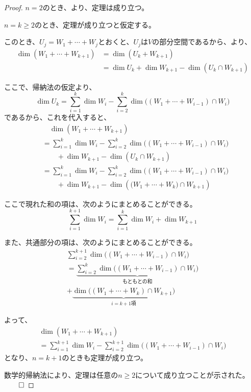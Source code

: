 \documentclass[../../../topic_linear-algebra]{subfiles}
\begin{document}
\begin{proof}
  $n = 2$のとき、より、定理は成り立つ。
  
  \br
  
  $n = k \geq 2$のとき、定理が成り立つと仮定する。

  このとき、$U_j = W_1 + \cdots + W_j$とおくと、$U_j$は$V$の部分空間であるから、より、
  \begin{align*}
    \dim(W_1+\cdots+W_{k+1})
    &= \dim(U_k + W_{k+1}) \\
    &= \dim U_k + \dim W_{k+1} - \dim(U_k \cap W_{k+1})
  \end{align*}
  
  ここで、帰納法の仮定より、
  \begin{equation*}
    \dim U_k
=\sum_{i=1}^k \dim W_i
 -\sum_{i=2}^k
   \dim\bigl((W_1+\cdots+W_{i-1})\cap W_i\bigr)
  \end{equation*}
  であるから、これを代入すると、
  \begin{align*}
    &\quad \dim(W_1+\cdots+W_{k+1}) \\
    &= \sum_{i=1}^k \dim W_i -\sum_{i=2}^k \dim\bigl((W_1+\cdots+W_{i-1})\cap W_i\bigr) \\
    &\qquad + \dim W_{k+1} - \dim(U_k \cap W_{k+1}) \\
    &= \sum_{i=1}^k \dim W_i -\sum_{i=2}^k \dim\bigl((W_1+\cdots+W_{i-1})\cap W_i\bigr) \\
    &\qquad + \dim W_{k+1} - \dim(\bigl(W_1 + \cdots + W_k\bigr) \cap W_{k+1})
  \end{align*}
  
  ここで現れた和の項は、次のようにまとめることができる。
  \begin{equation*}
    \sum_{i=1}^{k+1} \dim W_i = \sum_{i=1}^{k} \dim W_i + \dim W_{k+1}
  \end{equation*}
  
  また、共通部分の項は、次のようにまとめることができる。
  \begin{multline*}
    \sum_{i=2}^{k+1} \dim\bigl((W_1+\cdots+W_{i-1})\cap W_i\bigr) \\
= \underbrace{\sum_{i=2}^{k} \dim\bigl((W_1+\cdots+W_{i-1})\cap W_i\bigr)}_{\text{もともとの和}} \\
+ \underbrace{\dim\bigl((W_1+\cdots+W_k)\cap W_{k+1}\bigr)}_{i=k+1\text{項}}
  \end{multline*}
  
  よって、
  \begin{multline*}
    \dim(W_1+\cdots+W_{k+1}) \\
    = \sum_{i=1}^{k+1} \dim W_i - \sum_{i=2}^{k+1} \dim\bigl((W_1+\cdots+W_{i-1})\cap W_i\bigr)
  \end{multline*}
  となり、$n = k + 1$のときも定理が成り立つ。
  
  数学的帰納法により、定理は任意の$n \geq 2$について成り立つことが示された。 $\qed$
\end{proof}
\end{document}
